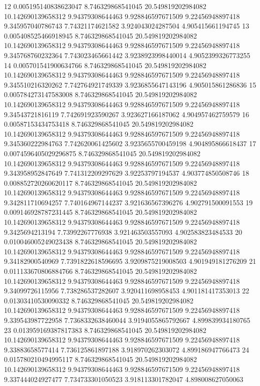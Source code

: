 {12 0.005195140838623047 8.746329868541045 20.549819202984082 10.142690139658312 9.94379308644463 9.928846597671509 9.22456948897418 9.345957040786743 7.74321174621582 3.924043024287504 4.905415661194745
13 0.005408525466918945 8.746329868541045 20.549819202984082 10.142690139658312 9.94379308644463 9.928846597671509 9.22456948897418 9.345768760232364 7.743023465661442 3.9238923998440014 4.9052399326773255
14 0.005701541900634766 8.746329868541045 20.549819202984082 10.142690139658312 9.94379308644463 9.928846597671509 9.22456948897418 9.345510216320262 7.742764921749339 3.9236855647143196 4.905015861286836
15 0.005784273147583008 8.746329868541045 20.549819202984082 10.142690139658312 9.94379308644463 9.928846597671509 9.22456948897418 9.34543721816119 7.742691923590267 3.923627166187062 4.904957462759579
16 0.00587153434753418 8.746329868541045 20.549819202984082 10.142690139658312 9.94379308644463 9.928846597671509 9.22456948897418 9.345360222984763 7.742620061425602 3.9235655700459198 4.904895866618437
17 0.0074596405029296875 8.746329868541045 20.549819202984082 10.142690139658312 9.94379308644463 9.928846597671509 9.22456948897418 9.343958952847649 7.741312209297629 3.92253797194537 4.903774850508746
18 0.008852720260620117 8.746329868541045 20.549819202984082 10.142690139658312 9.94379308644463 9.928846597671509 9.22456948897418 9.342811710694257 7.740164967144237 3.921636567396276 4.902791500091553
19 0.009146928787231445 8.746329868541045 20.549819202984082 10.142690139658312 9.94379308644463 9.928846597671509 9.22456948897418 9.3425694213194 7.73992267776938 3.921463503557093 4.902583823484533
20 0.010046005249023438 8.746329868541045 20.549819202984082 10.142690139658312 9.94379308644463 9.928846597671509 9.22456948897418 9.34182900540969 7.7391822618596695 3.9209875219008503 4.901949181276209
21 0.011133670806884766 8.746329868541045 20.549819202984082 10.142690139658312 9.94379308644463 9.928846597671509 9.22456948897418 9.34099726115956 7.738286537282607 3.920411698958453 4.901181417353013
22 0.01303410530090332 8.746329868541045 20.549819202984082 10.142690139658312 9.94379308644463 9.928846597671509 9.22456948897418 9.339543987722958 7.7368332638460044 3.9194055865792667 4.899839934180765
23 0.013959169387817383 8.746329868541045 20.549819202984082 10.142690139658312 9.94379308644463 9.928846597671509 9.22456948897418 9.33883658577414 7.736125861897188 3.918970262303072 4.899186947766473
24 0.015780210494995117 8.746329868541045 20.549819202984082 10.142690139658312 9.94379308644463 9.928846597671509 9.22456948897418 9.337444024927477 7.734733301050523 3.918113301782047 4.898008627050063
}
